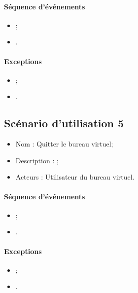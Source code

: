 \paragraph{Séquence d'événements}
\begin{itemize}
	\item ;
	\item .
\end{itemize}

\paragraph{Exceptions}
\begin{itemize}
	\item ;
	\item .
\end{itemize}


\subsection{Scénario d'utilisation 5}
\begin{itemize}
	\item Nom : Quitter le bureau virtuel;
	\item Description :  ;
	\item Acteurs : Utilisateur du bureau virtuel.
\end{itemize}

\paragraph{Séquence d'événements}
\begin{itemize}
	\item ;
	\item .
\end{itemize}

\paragraph{Exceptions}
\begin{itemize}
	\item ;
	\item .
\end{itemize}

